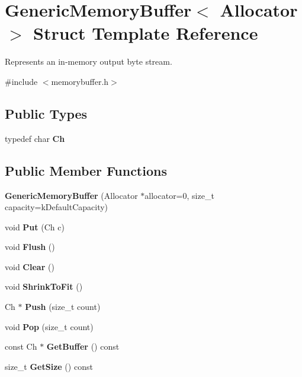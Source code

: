 \hypertarget{a02212}{}\section{Generic\+Memory\+Buffer$<$ Allocator $>$ Struct Template Reference}
\label{a02212}


Represents an in-\/memory output byte stream.  




{\ttfamily \#include $<$memorybuffer.\+h$>$}

\subsection*{Public Types}
\begin{DoxyCompactItemize}
\item 
\mbox{\label{a02212_a212f137abfd8bce2ad216b2d960c027f}} 
typedef char {\bfseries Ch}
\end{DoxyCompactItemize}
\subsection*{Public Member Functions}
\begin{DoxyCompactItemize}
\item 
\mbox{\label{a02212_ad08f7da47bca43fcdb0c3b10e22dfa1d}} 
{\bfseries Generic\+Memory\+Buffer} (Allocator $\ast$allocator=0, size\+\_\+t capacity=k\+Default\+Capacity)
\item 
\mbox{\label{a02212_a9dfb477983e211893601f8ab637b42d8}} 
void {\bfseries Put} (Ch c)
\item 
\mbox{\label{a02212_a9861181cab6f5bec2ec08b601aa53575}} 
void {\bfseries Flush} ()
\item 
\mbox{\label{a02212_a036cbe2556778e1edc525602a9821df2}} 
void {\bfseries Clear} ()
\item 
\mbox{\label{a02212_a3b87deb9bf34c394c8fb262ab53c0c4b}} 
void {\bfseries Shrink\+To\+Fit} ()
\item 
\mbox{\label{a02212_a56f7b14d2940b682fe592f598d6792ec}} 
Ch $\ast$ {\bfseries Push} (size\+\_\+t count)
\item 
\mbox{\label{a02212_a82a6706286f1356e1769282f5d496005}} 
void {\bfseries Pop} (size\+\_\+t count)
\item 
\mbox{\label{a02212_a8d7be8b1d64285b787571541a7c4bb37}} 
const Ch $\ast$ {\bfseries Get\+Buffer} () const
\item 
\mbox{\label{a02212_aaab1f18d03109ab01213d3e3d8368ff9}} 
size\+\_\+t {\bfseries Get\+Size} () const
\end{DoxyCompactItemize}
